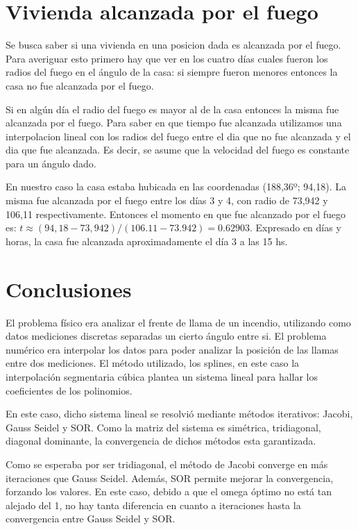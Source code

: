 \documentclass[12pt,spanish]{article}
\begin{document}
\section*{Vivienda alcanzada por el fuego}
Se busca saber si una vivienda en una posicion dada es alcanzada por el fuego.
Para averiguar esto primero hay que ver en los cuatro días cuales fueron los radios del fuego en el ángulo de la casa: si siempre fueron menores entonces la casa no fue alcanzada por el fuego.

Si en algún día el radio del fuego es mayor al de la casa entonces la misma fue alcanzada por el fuego. Para saber en que tiempo fue alcanzada utilizamos una interpolacion lineal con los radios del fuego entre el dia que no fue alcanzada y el dia que fue alcanzada. Es decir, se asume que la velocidad del fuego es constante para un ángulo dado.

En nuestro caso la casa estaba hubicada en las coordenadas (188,36º; 94,18). La misma fue alcanzada por el fuego entre los días 3 y 4, con radio de 73,942 y 106,11 respectivamente.
Entonces el momento en que fue alcanzado por el fuego es: $t \approx (94,18 - 73,942)/(106.11 - 73.942) = 0.62903$.
Expresado en días y horas, la casa fue alcanzada aproximadamente el día 3 a las 15 hs.

\section*{Conclusiones}
El problema físico era analizar el frente de llama de un incendio, utilizando como datos mediciones discretas separadas un cierto ángulo entre si. El problema numérico era interpolar los datos para poder analizar la posición de las llamas entre dos mediciones. El método utilizado, los splines, en este caso la interpolación segmentaria cúbica plantea un sistema lineal para hallar los coeficientes de los polinomios. 

En este caso, dicho sistema lineal se resolvió mediante métodos iterativos: Jacobi, Gauss Seidel y SOR. Como la matriz del sistema es simétrica, tridiagonal, diagonal dominante, la convergencia de dichos métodos esta garantizada.

Como se esperaba por ser tridiagonal, el método de Jacobi converge en más iteraciones que Gauss Seidel. Además, SOR permite mejorar la convergencia, forzando los valores. En este caso, debido a que el omega óptimo no está tan alejado del 1, no hay tanta diferencia en cuanto a iteraciones hasta la convergencia entre Gauss Seidel y SOR. 
\end{document}
